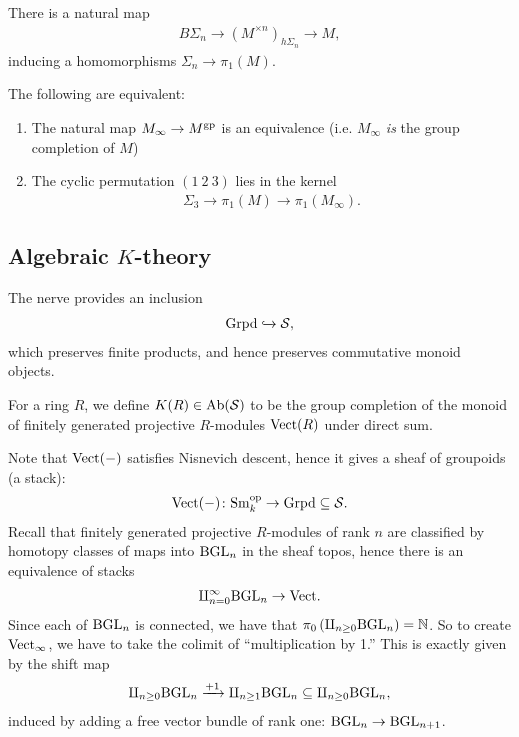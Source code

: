 \documentclass[11pt,openany]{book}
\begin{document}
There is a natural map
\begin{align*}
    B\Sigma_n \to (M^{\times n})_{h\Sigma_n} \to M,
\end{align*}
inducing a homomorphisms $\Sigma_n \to \pi_1(M)$.

\begin{theorem} \cite[Prop.~6]{Nikolaus-gp}
The following are equivalent:
\begin{enumerate}
    \item The natural map $M_\infty \to M^{\mathrm{gp}}$ is an equivalence (i.e. $M_\infty$ \textit{is} the group completion of $M$)
    \item The cyclic permutation $(1\ 2\ 3)$ lies in the kernel
    \begin{align*}
        \Sigma_3 \to \pi_1(M) \to \pi_1(M_\infty).
    \end{align*} 
\end{enumerate}
\end{theorem}

\subsection{Algebraic $K$-theory}

The nerve provides an inclusion
\begin{align*}
    \mathrm{Grpd} \xhookrightarrow{} \mathcal{S},
\end{align*}
which preserves finite products, and hence preserves commutative monoid objects.

\begin{definition} For a ring $R$, we define $K(R) \in \mathrm{Ab}(\mathcal{S})$ to be the group completion of the monoid of finitely generated projective $R$-modules $\mathrm{Vect}(R)$ under direct sum.
\end{definition}

Note that $\mathrm{Vect}(-)$ satisfies Nisnevich descent, hence it gives a sheaf of groupoids (a stack):
\begin{align*}
    \mathrm{Vect}(-) \colon \mathrm{Sm}_k^{\mathrm{op}} \to \mathrm{Grpd} \subseteq \mathcal{S}.
\end{align*}
%
Recall that finitely generated projective $R$-modules of rank $n$ are classified by homotopy classes of maps into $\mathrm{BGL}_n$ in the sheaf topos, hence there is an equivalence of stacks
\begin{align*}
    \amalg_{n=0}^\infty \mathrm{BGL}_n \to \mathrm{Vect}.
\end{align*}
%
Since each of $\mathrm{BGL}_n$ is connected, we have that $\pi_0 \left( \amalg_{n\ge0} \mathrm{BGL}_n \right) = \mathbb{N}$. So to create $\mathrm{Vect}_\infty$, we have to take the colimit of ``multiplication by 1.'' This is exactly given by the shift map
\begin{align*}
    \amalg_{n\ge0} \mathrm{BGL}_n\xrightarrow{\text{+1}} \amalg_{n\ge 1} \mathrm{BGL}_n \subseteq \amalg_{n\ge 0}\mathrm{BGL}_n,
\end{align*}
induced by adding a free vector bundle of rank one: $\mathrm{BGL}_n \to \mathrm{BGL}_{n+1}$.
\end{document}
